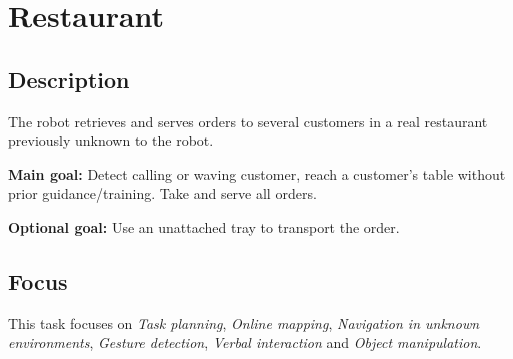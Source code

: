 \section{Restaurant}
\label{test:restaurant}

\subsection*{Description}

The robot retrieves and serves orders to several customers in a real restaurant previously unknown to the robot.

\textbf{Main goal:}
	Detect calling or waving customer, reach a customer’s table without prior guidance/training. Take and serve all orders.
	
\textbf{Optional goal:}
	Use an unattached tray to transport the order.


\subsection*{Focus}
This task focuses on
\textit{Task planning},
\textit{Online mapping},
\textit{Navigation in unknown environments},
\textit{Gesture detection},
\textit{Verbal interaction} and
\textit{Object manipulation}.	

